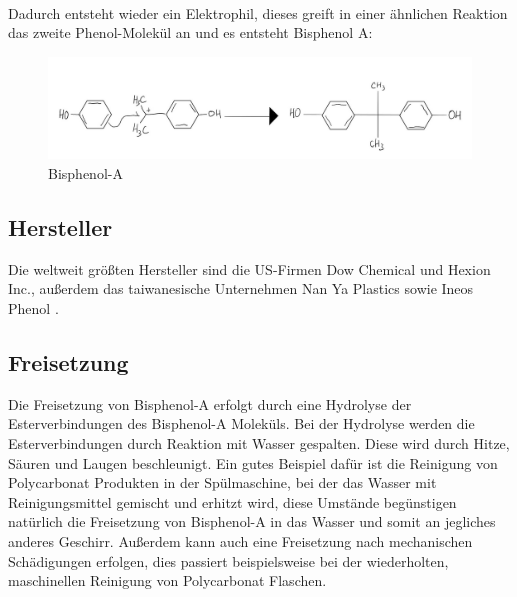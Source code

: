 \\Dadurch entsteht wieder ein Elektrophil, dieses greift in einer ähnlichen Reaktion das zweite Phenol-Molekül an und es entsteht Bisphenol A:
\begin{figure}[htpb]
    \centering
    \includegraphics[width=1\textwidth]{BisphenolA.jpg}
    \caption{Bisphenol-A}
\end{figure}
\subsection{Hersteller}
Die weltweit größten Hersteller sind die US-Firmen \glqq Dow Chemical\grqq{} und \glqq Hexion Inc.\grqq{}, außerdem das taiwanesische Unternehmen \glqq Nan Ya Plastics\grqq{} sowie \glqq Ineos Phenol\grqq{} \cite{Wikipedia}.
\subsection{Freisetzung}
Die Freisetzung von Bisphenol-A erfolgt durch eine Hydrolyse der Esterverbindungen des Bisphenol-A Moleküls\cite{Freisetzung}. Bei der Hydrolyse werden die Esterverbindungen durch Reaktion mit Wasser gespalten. Diese wird durch Hitze, Säuren und Laugen beschleunigt. Ein gutes Beispiel dafür ist die Reinigung von Polycarbonat Produkten in der Spülmaschine, bei der das Wasser mit Reinigungsmittel gemischt und erhitzt wird, diese Umstände begünstigen natürlich die Freisetzung von Bisphenol-A in das Wasser und somit an jegliches anderes Geschirr. Außerdem kann auch eine Freisetzung nach mechanischen Schädigungen erfolgen, dies passiert beispielsweise bei der wiederholten, maschinellen Reinigung von Polycarbonat Flaschen.
